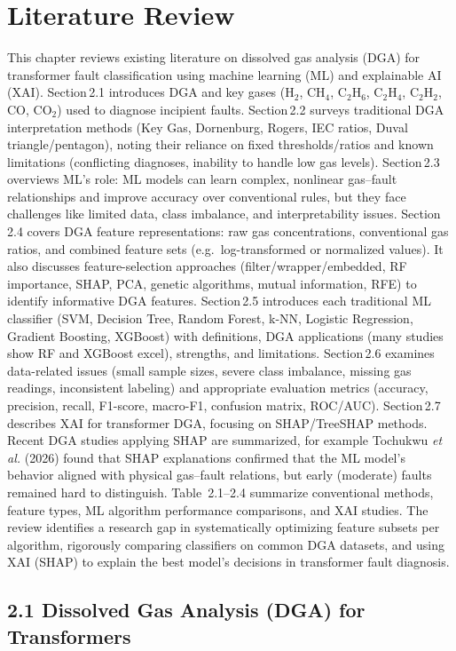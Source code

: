 \chapter{Literature Review}
This chapter reviews existing literature on dissolved gas analysis (DGA)
for transformer fault classification using machine learning (ML) and
explainable AI (XAI). Section\,2.1 introduces DGA and key gases (H$_2$,
CH$_4$, C$_2$H$_6$, C$_2$H$_4$, C$_2$H$_2$, CO, CO$_2$) used to diagnose incipient faults.
Section\,2.2 surveys traditional DGA interpretation methods (Key Gas,
Dornenburg, Rogers, IEC ratios, Duval triangle/pentagon), noting their
reliance on fixed thresholds/ratios and known limitations (conflicting
diagnoses, inability to handle low gas levels). Section\,2.3 overviews
ML's role: ML models can learn complex, nonlinear gas--fault
relationships and improve accuracy over conventional rules, but they
face challenges like limited data, class imbalance, and interpretability
issues. Section\,2.4 covers DGA feature representations: raw gas
concentrations, conventional gas ratios, and combined feature sets
(e.g.~log-transformed or normalized values). It also discusses
feature-selection approaches (filter/wrapper/embedded, RF importance,
SHAP, PCA, genetic algorithms, mutual information, RFE) to identify
informative DGA features. Section\,2.5 introduces each traditional ML
classifier (SVM, Decision Tree, Random Forest, k-NN, Logistic
Regression, Gradient Boosting, XGBoost) with definitions, DGA
applications (many studies show RF and XGBoost excel), strengths, and
limitations. Section\,2.6 examines data-related issues (small sample
sizes, severe class imbalance, missing gas readings, inconsistent
labeling) and appropriate evaluation metrics (accuracy, precision,
recall, F1-score, macro-F1, confusion matrix, ROC/AUC). Section\,2.7
describes XAI for transformer DGA, focusing on SHAP/TreeSHAP methods.
Recent DGA studies applying SHAP are summarized, for example Tochukwu
\emph{et al.} (2026) found that SHAP explanations confirmed that the ML
model's behavior aligned with physical gas--fault relations, but early
(moderate) faults remained hard to distinguish. Table~2.1--2.4 summarize
conventional methods, feature types, ML algorithm performance
comparisons, and XAI studies. The review identifies a research gap in
systematically optimizing feature subsets per algorithm, rigorously
comparing classifiers on common DGA datasets, and using XAI (SHAP) to
explain the best model's decisions in transformer fault diagnosis.
\section{2.1 Dissolved Gas Analysis (DGA) for
Transformers}\label{dissolved-gas-analysis-dga-for-transformers}


